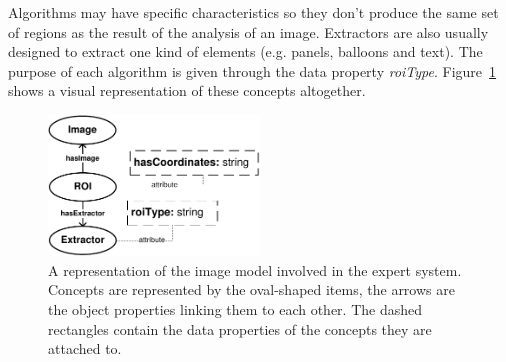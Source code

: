 Algorithms may have specific characteristics so they don't produce the same set of regions as the result of the analysis of an image.
Extractors are also usually designed to extract one kind of elements (e.g. panels, balloons and text).
The purpose of each algorithm is given through the data property \textit{roiType}.
Figure~\ref{fig:kn:model_image} shows a visual representation of these concepts altogether.

 \begin{figure}[!ht]
   \centering
  \includegraphics[width=0.5\textwidth]{model_image.pdf}
  \caption[A representation of the image model involved in the expert system]{A representation of the image model involved in the expert system. Concepts are represented by the oval-shaped items, the arrows are the object properties linking them to each other. The dashed rectangles contain the data properties of the concepts they are attached to.}
  \label{fig:kn:model_image}
 \end{figure}



